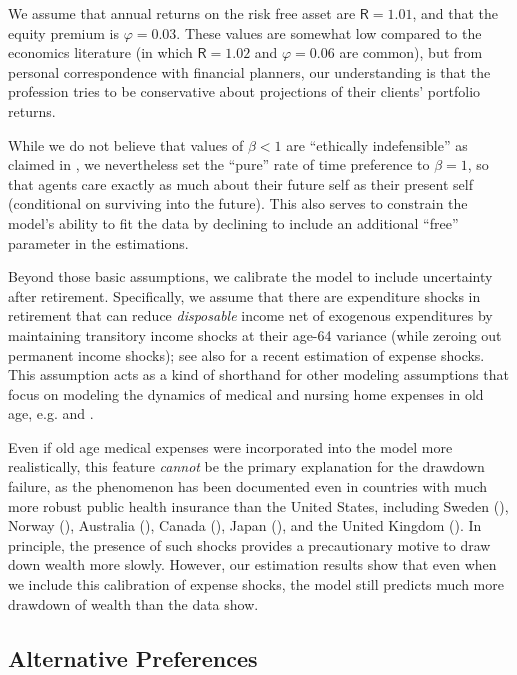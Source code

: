 \documentclass[12pt,letterpaper, fleqn]{article}
\newcommand{\DiscFac}{\beta}
\newcommand{\Rfree}{\mathsf{R}}
\newcommand{\eprem}{\varphi}
\begin{document}
We assume that annual returns on the risk free asset are $\Rfree = 1.01$, and that the equity premium is $\eprem = 0.03$.
These values are somewhat low compared to the economics literature (in which $\Rfree = 1.02$ and $\eprem = 0.06$ are common), but from personal correspondence with financial planners, our understanding is that the profession tries to be conservative about projections of their clients' portfolio returns.

While we do not believe that values of $\DiscFac < 1$ are ``ethically indefensible'' as claimed in \cite{Ramsey1928}, we nevertheless set the ``pure'' rate of time preference to $\DiscFac=1$, so that agents care exactly as much about their future self as their present self (conditional on surviving into the future).
This also serves to constrain the model's ability to fit the data by declining to include an additional ``free'' parameter in the estimations.

Beyond those basic assumptions, we calibrate the model to include uncertainty after retirement.
Specifically, we assume that there are expenditure shocks in retirement that can reduce \textit{disposable} income net of exogenous expenditures by maintaining transitory income shocks at their age-64 variance (while zeroing out permanent income shocks); see also \cite{flExpShocks} for a recent estimation of expense shocks.
This assumption acts as a kind of shorthand for other modeling assumptions that focus on modeling the dynamics of medical and nursing home expenses in old age, e.g. \cite{ameriks2011joy} and \cite{DeNardi2010}.

Even if old age medical expenses were incorporated into the model more realistically, this feature \textit{cannot} be the primary explanation for the drawdown failure, as the phenomenon has been documented even in countries with much more robust public health insurance than the United States, including Sweden (\cite{Ljunge2013}), Norway (\cite{Hattrem2022}), Australia (\cite{AustralianWealth2021}), Canada (\cite{Hamilton2001}), Japan (\cite{Niimi_2019}), and the United Kingdom (\cite{Crawford2018}).
In principle, the presence of such shocks provides a precautionary motive to draw down wealth more slowly.
However, our estimation results show that even when we include this calibration of expense shocks, the model still predicts much more drawdown of wealth than the data show.

\subsection{Alternative Preferences}
\end{document}
